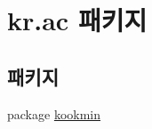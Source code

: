 \hypertarget{namespacekr_1_1ac}{}\section{kr.\+ac 패키지}
\label{namespacekr_1_1ac}
\subsection*{패키지}
\begin{DoxyCompactItemize}
\item 
package \hyperlink{namespacekr_1_1ac_1_1kookmin}{kookmin}
\end{DoxyCompactItemize}
